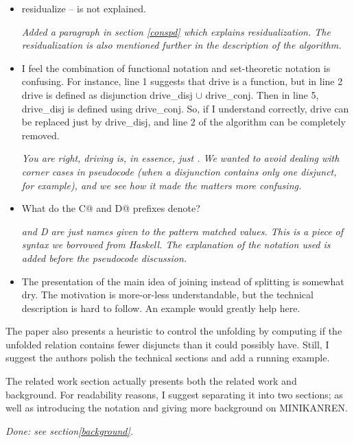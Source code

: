 \begin{itemize}
 \item residualize -- is not explained.

 \emph{Added a paragraph in section \ref{conspd} which explains residualization. The residualization is also mentioned further in the description of the algorithm.}

 \item I feel the combination of functional notation and set-theoretic notation is confusing. For instance, line 1 suggests that drive is a function, but in line 2 drive is defined as disjunction drive_disj $\cup$ drive_conj. Then in line 5, drive_disj is defined using drive_conj. So, if I understand correctly, drive can be replaced just by drive_disj, and line 2 of the algorithm can be completely removed.

\emph{You are right, driving is, in essence, just . We wanted to avoid dealing with corner cases in pseudocode (when a disjunction contains only one disjunct, for example), and we see how it made the matters more confusing.}

 \item What do the C@ and D@ prefixes denote?

\emph{ and \emph{D} are just names given to the pattern matched values. This is a piece of syntax we borrowed from Haskell. The explanation of the notation used is added before the pseudocode discussion.}

 \item The presentation of the main idea of joining instead of splitting is somewhat dry. The motivation is more-or-less understandable, but the technical description is hard to follow. An example would greatly help here.

\end{itemize}

The paper also presents a heuristic to control the unfolding by computing if the unfolded relation contains fewer disjuncts than it could possibly have. Still, I suggest the authors polish the technical sections and add a running example.


The related work section actually presents both the related work and background. For readability reasons, I suggest separating it into two sections; as well as introducing the notation and giving more background on MINIKANREN.

\emph{Done: see section\ref{background}.}

